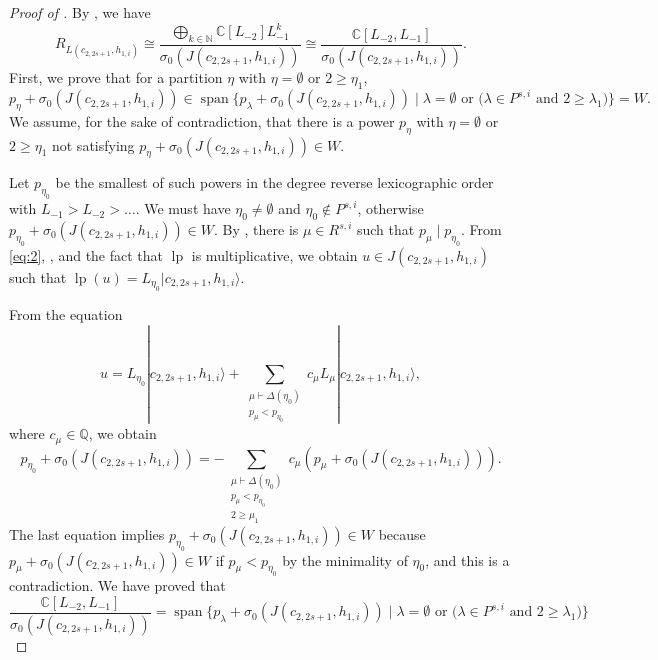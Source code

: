 \documentclass[a4paper, 12pt, reqno]{amsart}
\theoremstyle{remark}
\DeclareMathOperator{\vspan}{span}
\DeclareMathOperator{\lp}{lp}
\begin{document}
\begin{proof}[Proof of ]
  By , we have
  \begin{equation*}
    R_{L(c_{2, 2s + 1}, h_{1, i})} \cong \frac{\bigoplus_{k \in \mathbb{N}}\mathbb{C}[L_{-2}]L_{-1}^k}{\sigma_0(J(c_{2, 2s + 1}, h_{1, i}))} \cong \frac{\mathbb{C}[L_{-2}, L_{-1}]}{\sigma_0(J(c_{2, 2s + 1}, h_{1, i}))}.
  \end{equation*}
  First, we prove that for a partition $\eta$ with $\eta = \emptyset$ or $2 \ge \eta_1$,
  \begin{equation*}
    p_{\eta} + \sigma_0(J(c_{2, 2s + 1}, h_{1, i})) \in \vspan\{p_{\lambda} + \sigma_0(J(c_{2, 2s + 1}, h_{1, i})) \mid \text{$\lambda = \emptyset$ or ($\lambda \in P^{s, i}$ and $2 \ge \lambda_1$)}\} = W.
  \end{equation*}
  We assume, for the sake of contradiction, that there is a power $p_{\eta}$ with $\eta = \emptyset$ or $2 \ge \eta_1$ not satisfying $p_{\eta} + \sigma_0(J(c_{2, 2s + 1}, h_{1, i})) \in W$.

  Let $p_{\eta_0}$ be the smallest of such powers in the degree reverse lexicographic order with $L_{-1} > L_{-2} > \dots$.
  We must have $\eta_0 \neq \emptyset$ and $\eta_0 \notin P^{s, i}$, otherwise $p_{\eta_0} + \sigma_0(J(c_{2, 2s + 1}, h_{1, i})) \in W$.
  By , there is $\mu \in R^{s, i}$ such that $p_{\mu} \mid p_{\eta_0}$.
  From \eqref{eq:2}, ,  and the fact that $\lp$ is multiplicative, we obtain $u \in J(c_{2, 2s + 1}, h_{1, i})$ such that $\lp(u) = L_{\eta_0}|c_{2, 2s + 1}, h_{1, i}\rangle$.

  From the equation
  \begin{equation*}
    u = L_{\eta_0}|c_{2, 2s + 1}, h_{1, i}\rangle + \sum_{\substack{\mu \vdash \Delta(\eta_0) \\ p_{\mu} < p_{\eta_0}}}c_{\mu}L_{\mu}|c_{2, 2s + 1}, h_{1, i}\rangle,
  \end{equation*}
  where $c_{\mu} \in \mathbb{Q}$, we obtain
  \begin{equation*}
    p_{\eta_0} + \sigma_0(J(c_{2, 2s + 1}, h_{1, i}))= -\sum_{\substack{\mu \vdash \Delta(\eta_0) \\ p_{\mu} < p_{\eta_0} \\ 2 \ge \mu_1} }c_{\mu}(p_{\mu} + \sigma_0(J(c_{2, 2s + 1}, h_{1, i}))).
  \end{equation*}
  The last equation implies $p_{\eta_0} + \sigma_0(J(c_{2, 2s + 1}, h_{1, i})) \in W$ because $p_{\mu} + \sigma_0(J(c_{2, 2s + 1}, h_{1, i})) \in W$ if $p_{\mu} < p_{\eta_0}$ by the minimality of $\eta_0$, and this is a contradiction.
  We have proved that
  \begin{equation}
    \label{eq:10}
    \frac{\mathbb{C}[L_{-2}, L_{-1}]}{\sigma_0(J(c_{2, 2s + 1}, h_{1, i}))} = \vspan\{p_{\lambda} + \sigma_0(J(c_{2, 2s + 1}, h_{1, i})) \mid \text{$\lambda = \emptyset$ or ($\lambda \in P^{s, i}$ and $2 \ge \lambda_1$)}\}
  \end{equation}


\end{proof}
\end{document}
